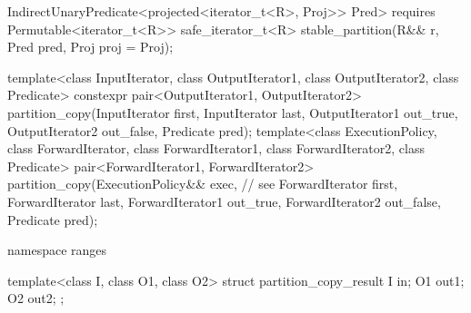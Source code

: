 \begin{addedblock}
\begin{codeblock}
{        IndirectUnaryPredicate<projected<iterator_t<R>, Proj>> Pred>
      requires Permutable<iterator_t<R>>
      safe_iterator_t<R> stable_partition(R&& r, Pred pred, Proj proj = Proj{});
  }
\end{codeblock}\end{addedblock}\begin{codeblock}
  template<class InputIterator, class OutputIterator1,
           class OutputIterator2, class Predicate>
    constexpr pair<OutputIterator1, OutputIterator2>
      partition_copy(InputIterator first, InputIterator last,
                     OutputIterator1 out_true, OutputIterator2 out_false,
                     Predicate pred);
  template<class ExecutionPolicy, class ForwardIterator, class ForwardIterator1,
           class ForwardIterator2, class Predicate>
    pair<ForwardIterator1, ForwardIterator2>
      partition_copy(ExecutionPolicy&& exec, // see 
                     ForwardIterator first, ForwardIterator last,
                     ForwardIterator1 out_true, ForwardIterator2 out_false,
                     Predicate pred);
\end{codeblock}\begin{addedblock}\begin{codeblock}
  namespace ranges {
    template<class I, class O1, class O2>
    struct partition_copy_result {
      I  in;
      O1 out1;
      O2 out2;
    };

}
\end{codeblock}
\end{addedblock}

